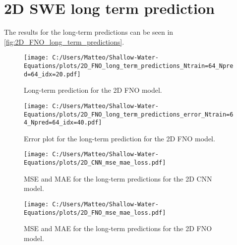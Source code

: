 \section{2D SWE long term prediction}
The results for the long-term predictions can be seen in \autoref{fig:2D_FNO_long_term_predictions}.
\begin{figure}[H]
    \centering
    \texttt{[image: C:/Users/Matteo/Shallow-Water-Equations/plots/2D\_FNO\_long\_term\_predictions\_Ntrain=64\_Npred=64\_idx=20.pdf]}
    \caption{Long-term prediction for the 2D FNO model.}\label{fig:2D_FNO_long_term_predictions}
\end{figure}


\begin{figure}[H]
    \centering
    \texttt{[image: C:/Users/Matteo/Shallow-Water-Equations/plots/2D\_FNO\_long\_term\_predictions\_error\_Ntrain=64\_Npred=64\_idx=40.pdf]}
    \caption{Error plot for the long-term prediction for the 2D FNO model.}\label{fig:2D_FNO_long_term_error_40}
\end{figure}


\begin{figure}[H]
    \centering
    \texttt{[image: C:/Users/Matteo/Shallow-Water-Equations/plots/2D\_CNN\_mse\_mae\_loss.pdf]}
    \caption{MSE and MAE for the long-term predictions for the 2D CNN model.}\label{fig:2D_CNN_mse_mae_loss}
\end{figure}

\begin{figure}[H]
    \centering
    \texttt{[image: C:/Users/Matteo/Shallow-Water-Equations/plots/2D\_FNO\_mse\_mae\_loss.pdf]}
    \caption{MSE and MAE for the long-term predictions for the 2D FNO model.}\label{fig:2D_FNO_mse_mae_loss}
\end{figure}



